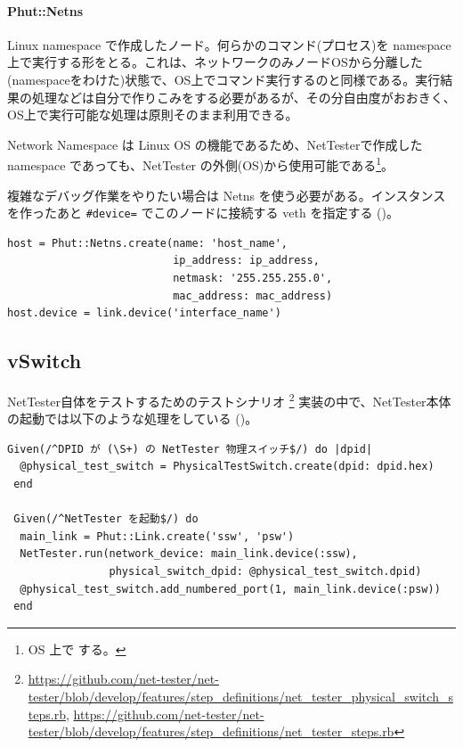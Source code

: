 \paragraph{Phut::Netns}
Linux namespace で作成したノード。何らかのコマンド(プロセス)を namespace
上で実行する形をとる。これは、ネットワークのみノードOSから分離した
(namespaceをわけた)状態で、OS上でコマンド実行するのと同様である。実行結
果の処理などは自分で作りこみをする必要があるが、その分自由度がおおきく、
OS上で実行可能な処理は原則そのまま利用できる。

Network Namespace は Linux OS の機能であるため、NetTesterで作成した
namespace であっても、NetTester の外側(OS)から使用可能である\footnote{OS
上で  する。}。

複雑なデバッグ作業をやりたい場合は Netns を使う必要がある。インスタンス
を作ったあと \verb|#device=| でこのノードに接続する veth を指定する
()。

\begin{lstlisting}[caption=Phut::Netnsインスタンスの作成,label=lst:create-netns-instance]
host = Phut::Netns.create(name: 'host_name',
                          ip_address: ip_address,
                          netmask: '255.255.255.0',
                          mac_address: mac_address)
host.device = link.device('interface_name')
\end{lstlisting}

\subsection{vSwitch}

NetTester自体をテストするためのテストシナリオ
\footnote{\url{https://github.com/net-tester/net-tester/blob/develop/features/step_definitions/net_tester_physical_switch_steps.rb},
\url{https://github.com/net-tester/net-tester/blob/develop/features/step_definitions/net_tester_steps.rb}}
実装の中で、NetTester本体の起動では以下のような処理をしている
()。
\begin{lstlisting}[caption=NetTesterの起動,label=lst:run-nettester]
 Given(/^DPID が (\S+) の NetTester 物理スイッチ$/) do |dpid|
  @physical_test_switch = PhysicalTestSwitch.create(dpid: dpid.hex)
 end

 Given(/^NetTester を起動$/) do
  main_link = Phut::Link.create('ssw', 'psw')
  NetTester.run(network_device: main_link.device(:ssw),
                physical_switch_dpid: @physical_test_switch.dpid)
  @physical_test_switch.add_numbered_port(1, main_link.device(:psw))
 end
\end{lstlisting}

